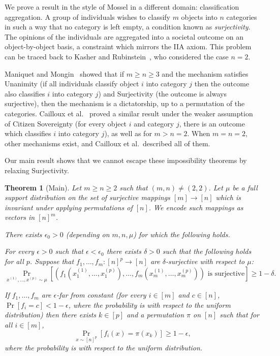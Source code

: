 \documentclass{article}
\newtheorem{theorem}{Theorem}[section]
\theoremstyle{definition}
\theoremstyle{remark}
\begin{document}
We prove a result in the style of Mossel in a different domain: classification aggregation. A group of individuals wishes to classify $m$ objects into $n$ categories in such a way that no category is left empty, a condition known as \emph{surjectivity}. The opinions of the individuals are aggregated into a societal outcome on an object-by-object basis, a constraint which mirrors the IIA axiom. This problem can be traced back to Kasher and Rubinstein~\cite{KasherRubinstein}, who considered the case $n = 2$.

Maniquet and Mongin~\cite{ManiquetMonginTR,ManiquetMongin} showed that if $m \ge n \ge 3$ and the mechanism satisfies Unanimity (if all individuals classify object $i$ into category $j$ then the outcome also classifies $i$ into category $j$) and Surjectivity (the outcome is always surjective), then the mechanism is a dictatorship, up to a permutation of the categories. Cailloux et al.~\cite{CHOS} proved a similar result under the weaker assumption of Citizen Sovereignty (for every object $i$ and category $j$, there is an outcome which classifies $i$ into category $j$), as well as for $m > n = 2$. When $m = n = 2$, other mechanisms exist, and Cailloux et al.\ described all of them.

Our main result shows that we cannot escape these impossibility theorems by relaxing Surjectivity.

\begin{theorem}[Main] \label{thm:main}
Let $m \ge n \ge 2$ such that $(m,n) \neq (2,2)$. Let $\mu$ be a full support distribution on the set of surjective mappings $[m] \to [n]$ which is invariant under applying permutations of $[n]$. We encode such mappings as vectors in $[n]^m$.

There exists $\epsilon_0 > 0$ (depending on $m,n,\mu$) for which the following holds.

For every $\epsilon > 0$ such that $\epsilon < \epsilon_0$ there exists $\delta > 0$ such that the following holds for all $p$. Suppose that $f_1,\dots,f_m\colon [n]^p \to [n]$ are \emph{$\delta$-surjective with respect to $\mu$}:
\[
 \Pr_{x^{(1)},\dots,x^{(p)} \sim \mu}[(f_1(x^{(1)}_1, \dots, x^{(p)}_1),\dots,f_m(x^{(1)}_m,\dots,x^{(p)}_m)) \text{ is surjective}] \ge 1 - \delta.
\]

If $f_1,\dots,f_m$ are \emph{$\epsilon$-far from constant} (for every $i \in [m]$ and $c \in [n]$, $\Pr[f_i=c] < 1-\epsilon$, where the probability is with respect to the uniform distribution) then there exists $k \in [p]$ and a permutation $\pi$ on $[n]$ such that for all $i \in [m]$,
\[
 \Pr_{x \sim [n]^p}[f_i(x) = \pi(x_k)] \ge 1-\epsilon,
\]
where the probability is with respect to the uniform distribution.
\end{theorem}
\end{document}

